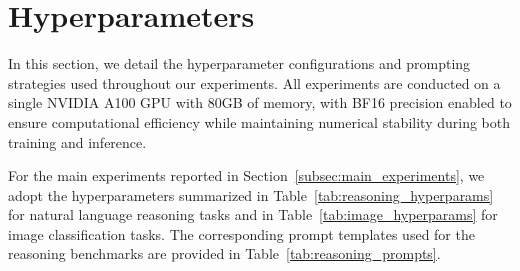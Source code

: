 \documentclass{article}
\theoremstyle{plain}
\theoremstyle{definition}
\theoremstyle{remark}
\begin{document}
\section{Hyperparameters}
\label{appendix:hyperparameters}

In this section, we detail the hyperparameter configurations and prompting strategies used throughout our experiments. All experiments are conducted on a single NVIDIA A100 GPU with 80GB of memory, with BF16 precision enabled to ensure computational efficiency while maintaining numerical stability during both training and inference.

\begin{table}[ht]
  \renewcommand\arraystretch{1.1}
  \caption{Hyperparameters for reasoning tasks. In reasoning experiments, we use the same hyperparameters on both Llama2-7B and Llama3-8B models.}
  \label{tab:reasoning_hyperparams}
  \centering
\end{table}

For the main experiments reported in Section~\ref{subsec:main_experiments}, we adopt the hyperparameters summarized in Table~\ref{tab:reasoning_hyperparams} for natural language reasoning tasks and in Table~\ref{tab:image_hyperparams} for image classification tasks. The corresponding prompt templates used for the reasoning benchmarks are provided in Table~\ref{tab:reasoning_prompts}.
\end{document}

